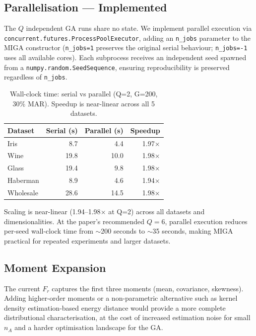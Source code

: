 \subsection{Parallelisation --- Implemented}

The $Q$ independent GA runs share no state. We implement parallel execution via \texttt{concurrent.futures.ProcessPoolExecutor}, adding an \texttt{n\_jobs} parameter to the MIGA constructor (\texttt{n\_jobs=1} preserves the original serial behaviour; \texttt{n\_jobs=-1} uses all available cores). Each subprocess receives an independent seed spawned from a \texttt{numpy.random.SeedSequence}, ensuring reproducibility is preserved regardless of \texttt{n\_jobs}.

\begin{table}[h]
\caption{Wall-clock time: serial vs parallel (Q=2, G=200, 30\% MAR). Speedup is near-linear across all 5 datasets.}
\label{tab:parallel_speedup}
\centering
\begin{tabular}{lrrr}
\toprule
\textbf{Dataset} & \textbf{Serial (s)} & \textbf{Parallel (s)} & \textbf{Speedup} \\
\midrule
Iris      &  8.7 &  4.4 & 1.97$\times$ \\
Wine      & 19.8 & 10.0 & 1.98$\times$ \\
Glass     & 19.4 &  9.8 & 1.98$\times$ \\
Haberman  &  8.9 &  4.6 & 1.94$\times$ \\
Wholesale & 28.6 & 14.5 & 1.98$\times$ \\
\bottomrule
\end{tabular}
\end{table}

Scaling is near-linear (1.94--1.98$\times$ at Q=2) across all datasets and dimensionalities. At the paper's recommended $Q=6$, parallel execution reduces per-seed wall-clock time from $\sim$200 seconds to $\sim$35 seconds, making MIGA practical for repeated experiments and larger datasets.

\subsection{Moment Expansion}

The current $F_r$ captures the first three moments (mean, covariance, skewness). Adding higher-order moments or a non-parametric alternative such as kernel density estimation-based energy distance would provide a more complete distributional characterisation, at the cost of increased estimation noise for small $n_A$ and a harder optimisation landscape for the GA.

